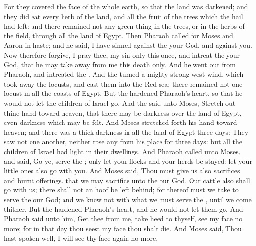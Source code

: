 \begin{biblechapter}
\verse For they covered the face of the whole earth, so that the land was darkened; and they did eat every herb of the land, and all the fruit of the trees which the hail had left: and there remained not any green thing in the trees, or in the herbs of the field, through all the land of Egypt.
\verse Then Pharaoh called for Moses and Aaron in haste; and he said, I have sinned against the \LORD your God, and against you.
\verse Now therefore forgive, I pray thee, my sin only this once, and intreat the \LORD your God, that he may take away from me this death only.
\verse And he went out from Pharaoh, and intreated the \LORD.
\verse And the \LORD turned a mighty strong west wind, which took away the locusts, and cast them into the Red sea; there remained not one locust in all the coasts of Egypt.
\verse But the \LORD hardened Pharaoh's heart, so that he would not let the children of Israel go.
 And the \LORD said unto Moses, Stretch out thine hand toward heaven, that there may be darkness over the land of Egypt, even darkness which may be felt.
\verse And Moses stretched forth his hand toward heaven; and there was a thick darkness in all the land of Egypt three days:
\verse They saw not one another, neither rose any from his place for three days: but all the children of Israel had light in their dwellings.
\verse And Pharaoh called unto Moses, and said, Go ye, serve the \LORD; only let your flocks and your herds be stayed: let your little ones also go with you.
\verse And Moses said, Thou must give us also sacrifices and burnt offerings, that we may sacrifice unto the \LORD our God.
\verse Our cattle also shall go with us; there shall not an hoof be left behind; for thereof must we take to serve the \LORD our God; and we know not with what we must serve the \LORD, until we come thither.
\verse But the \LORD hardened Pharaoh's heart, and he would not let them go.
\verse And Pharaoh said unto him, Get thee from me, take heed to thyself, see my face no more; for in that day thou seest my face thou shalt die.
\verse And Moses said, Thou hast spoken well, I will see thy face again no more.
\end{biblechapter}

\columnbreak %

